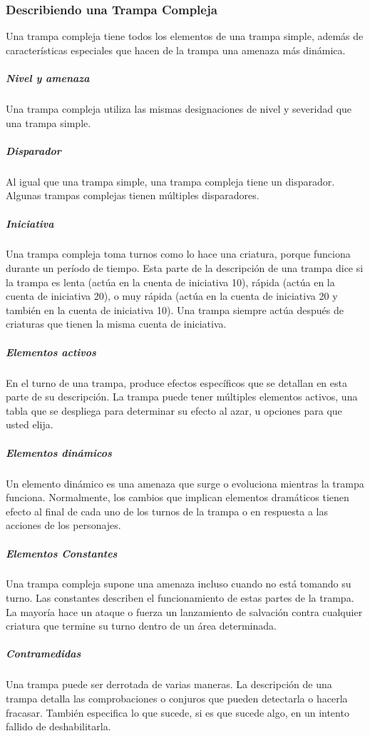 \documentclass[a4paper,twocolumn,openany,10pt]{dndbook}
\begin{document}
\subsubsection*{Describiendo una Trampa Compleja}
Una trampa compleja tiene todos los elementos de una trampa simple, además de características especiales que hacen de la trampa
una amenaza más dinámica.

\subparagraph{Nivel y amenaza} Una trampa compleja utiliza las mismas designaciones de nivel y severidad que una trampa simple.

\subparagraph{Disparador} Al igual que una trampa simple, una trampa compleja tiene un disparador. Algunas trampas complejas
tienen múltiples disparadores.

\subparagraph{Iniciativa} Una trampa compleja toma turnos como lo hace una criatura, porque funciona durante un período de
tiempo. Esta parte de la descripción de una trampa dice si la trampa es lenta (actúa en la cuenta de iniciativa 10), rápida
(actúa en la cuenta de iniciativa 20), o muy rápida (actúa en la cuenta de iniciativa 20 y también en la cuenta de iniciativa
10). Una trampa siempre actúa después de criaturas que tienen la misma cuenta de iniciativa.

\subparagraph{Elementos activos} En el turno de una trampa, produce efectos específicos que se detallan en esta parte de su
descripción. La trampa puede tener múltiples elementos activos, una tabla que se despliega para determinar su efecto al azar, u
opciones para que usted elija.

\subparagraph{Elementos dinámicos} Un elemento dinámico es una amenaza que surge o evoluciona mientras la trampa funciona.
Normalmente, los cambios que implican elementos dramáticos tienen efecto al final de cada uno de los turnos de la trampa o en
respuesta a las acciones de los personajes.

\subparagraph{Elementos Constantes} Una trampa compleja supone una amenaza incluso cuando no está tomando su turno. Las
constantes describen el funcionamiento de estas partes de la trampa. La mayoría hace un ataque o fuerza un lanzamiento de
salvación contra cualquier criatura que termine su turno dentro de un área determinada.

\subparagraph{Contramedidas} Una trampa puede ser derrotada de varias maneras. La descripción de una trampa detalla las
comprobaciones o conjuros que pueden detectarla o hacerla fracasar. También especifica lo que sucede, si es que sucede algo, en
un intento fallido de deshabilitarla.
\end{document}
